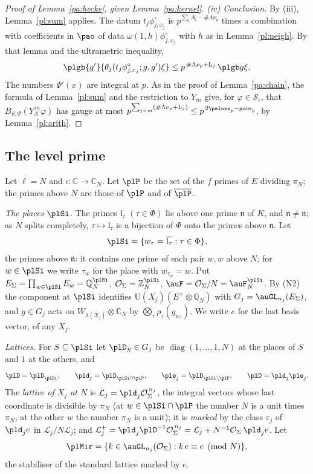 \documentclass[10pt]{amsart}
\theoremstyle{definition}
\theoremstyle{remark}
\newcommand{\C}{\mathbb C}
\newcommand{\Z}{\mathbb Z}
\newcommand{\Q}{\mathbb Q}
\providecommand{\auO}{\mathcal O}
\providecommand{\auPl}{\Phi}
\providecommand{\auS}{\mathcal S}
\providecommand{\auU}{\mathrm U}
\providecommand{\aubar}[1]{\overline{#1}}
\providecommand{\augain}{\operatorname{gain}}
\begin{document}
\begin{proof}[Proof of Lemma~\ref{pa:hecke}, given Lemma~\ref{pa:kernel}]
\emph{{\rm(iv)} Conclusion.} By (iii), Lemma~\ref{pl:sum} applies. The datum
$t_j\phi^\circ_{j,x_j}$ is $p^{\sum_{\mathfrak l}A_{\mathfrak l}-\#\Lambda\nu_p}$ times a
combination with coefficients in $\pao$ of data $\omega(1,h)\phi^\circ_{j,x_j}$ with $h$ as in
Lemma~\ref{pl:neigh}. By that lemma and the ultrametric inequality,
\[
\plgb{g'}{\theta_j(t_j\phi^\circ_{j,x_j};g,g')\xi}\le p^{\,\#\Lambda\nu_p+\mathrm L_j}\,\plgb g\xi .
\]
The numbers $\Psi'(x)$ are integral at $p$. As in the proof of Lemma~\ref{pa:chain}, the formula of
Lemma~\ref{pl:sum} and the restriction to $Y_m$ give, for $\varphi\in\auS_\iota$, that
$B_{\vartheta,\Psi}(Y_\Lambda^{\,m}\varphi)$ has gauge at most $p^{\sum_{j<m}(\#\Lambda\nu_p+\mathrm L_j)}
\le p^{\,2\paloss_p-\augain_p}$, by Lemma~\ref{pl:arith}.
\end{proof}

\subsection{The level prime}\label{pl:ss-level}
Let $\ell=N$ and $\iota\colon\C\to\C_N$. Let $\plP$ be the set of the $f$ primes of $E$
dividing $\pi_N$; the primes above $N$ are those of $\plP$ and of $\aubar\plP$.

\emph{The places $\plSi$.} The primes $\mathfrak l_\tau$ $(\tau\in\auPl)$ lie above one prime
$\mathfrak n$ of $K$, and $\mathfrak n\ne\aubar{\mathfrak n}$; as $N$ splits completely, $\tau
\mapsto\mathfrak l_\tau$ is a bijection of $\auPl$ onto the primes above $\mathfrak n$. Let
\[
\plSi=\{w_\tau=\aubar{\mathfrak l_\tau}:\tau\in\auPl\},
\]
the primes above $\aubar{\mathfrak n}$: it contains one prime of each pair $w,\aubar w$ above $N$;
for $w\in\plSi$ we write $\tau_w$ for the place with $w_{\tau_w}=w$.
Put $E_\Sigma=\prod_{w\in\plSi}E_w=\Q_N^{\plSi}$, $\auO_\Sigma=\Z_N^{\plSi}$, $\auF=\auO_\Sigma/N=
\auF_N^{\plSi}$. By (N2) the component at $\plSi$ identifies $\auU(X_j)(E^+\otimes\Q_N)$ with
$G_j=\auGL_{n_j}(E_\Sigma)$, and $g\in G_j$ acts on $W_{\lambda(X_j)}\otimes\C_N$ by $\bigotimes_\tau
\rho_\tau(g_{w_\tau})$. We write $e$ for the last basis vector, of any $X_j$.

\emph{Lattices.} For $S\subseteq\plSi$ let $\plD_S\in G_j$ be $\operatorname{diag}(1,\dots,1,N)$ at
the places of $S$ and $1$ at the others, and
\[
\plD=\plD_{\plSi},\qquad\pld_j=\plD_{\plSi\cap\plP},\qquad\ple_j=\plD_{\plSi\setminus\plP},\qquad
\plD=\pld_j\ple_j .
\]
The \emph{lattice of $X_j$ at $N$} is $\mathcal L_j=\pld_j\auO_\Sigma^{\,n_j}$, the integral vectors whose
last coordinate is divisible by $\pi_N$ (at $w\in\plSi\cap\plP$ the number $N$ is a unit times
$\pi_N$, at the other $w$ the number $\pi_N$ is a unit); it is \emph{marked} by the class
$\varepsilon_j$ of $\pld_je$ in $\mathcal L_j/N\mathcal L_j$; and $\mathcal L_j^+=\pld_j\plD^{-1}\auO_\Sigma^{\,n_j}=\mathcal L_j+
N^{-1}\auO_\Sigma\,\pld_je$. Let
\[
\plMir=\{k\in\auGL_{n_j}(\auO_\Sigma):k\,e\equiv e\pmod N\},
\]
the stabiliser of the standard lattice marked by $e$.
\end{document}
